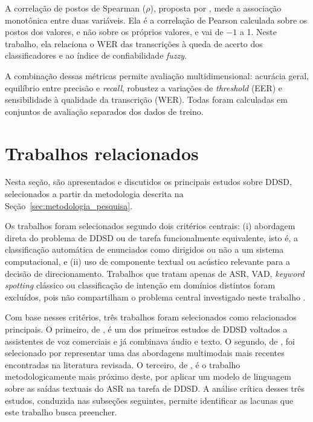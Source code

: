 \documentclass[
    12pt,                %
    openright,           %
    oneside,             %
    a4paper,             %
    english,             %
    brazil               %
]{abntex2}
\begin{document}
A correlação de postos de Spearman ($\rho$), proposta por , mede a associação monotônica entre duas variáveis. Ela é a correlação de Pearson calculada sobre os postos dos valores, e não sobre os próprios valores, e vai de $-1$ a 1. Neste trabalho, ela relaciona o WER das transcrições à queda de acerto dos classificadores e ao índice de confiabilidade \textit{fuzzy}.

A combinação dessas métricas permite avaliação multidimensional: acurácia geral, equilíbrio entre precisão e \textit{recall}, robustez a variações de \textit{threshold} (EER) e sensibilidade à qualidade da transcrição (WER). Todas foram calculadas em conjuntos de avaliação separados dos dados de treino.


\section{Trabalhos relacionados}
\label{sec:trabalhos_relacionados}

Nesta seção, são apresentados e discutidos os principais estudos sobre DDSD, selecionados a partir da metodologia descrita na Seção~\ref{sec:metodologia_pesquisa}.

Os trabalhos foram selecionados segundo dois critérios centrais: (i) abordagem direta do problema de DDSD ou de tarefa funcionalmente equivalente, isto é, a classificação automática de enunciados como dirigidos ou não a um sistema computacional, e (ii) uso de componente textual ou acústico relevante para a decisão de direcionamento. Trabalhos que tratam apenas de ASR, VAD, \textit{keyword spotting} clássico ou classificação de intenção em domínios distintos foram excluídos, pois não compartilham o problema central investigado neste trabalho \cite{Wazlawick2020}.

Com base nesses critérios, três trabalhos foram selecionados como relacionados principais. O primeiro, de , é um dos primeiros estudos de DDSD voltados a assistentes de voz comerciais e já combinava áudio e texto. O segundo, de , foi selecionado por representar uma das abordagens multimodais mais recentes encontradas na literatura revisada. O terceiro, de , é o trabalho metodologicamente mais próximo deste, por aplicar um modelo de linguagem sobre as saídas textuais do ASR na tarefa de DDSD. A análise crítica desses três estudos, conduzida nas subseções seguintes, permite identificar as lacunas que este trabalho busca preencher.
\end{document}
